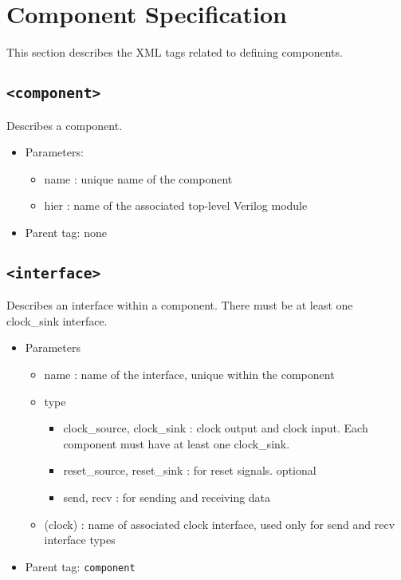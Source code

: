 \documentclass{article}
\begin{document}
\section{Component Specification}

This section describes the XML tags related to defining components.

\subsection{\texttt{<component>}}

Describes a component.

\begin{itemize}
\item{Parameters:}
\begin{itemize}
\item{name : unique name of the component}
\item{hier : name of the associated top-level Verilog module}
\end{itemize}
\item{Parent tag: none}
\end{itemize}

\subsection{\texttt{<interface>}}

Describes an interface within a component. There must be at least one clock\_sink interface.

\begin{itemize}
\item{Parameters}
\begin{itemize}
\item{name : name of the interface, unique within the component}
\item{type}
\begin{itemize}
\item{clock\_source, clock\_sink : clock output and clock input. Each component must have at least one clock\_sink.}
\item{reset\_source, reset\_sink : for reset signals. optional}
\item{send, recv : for sending and receiving data}
\end{itemize}
\item{(clock) : name of associated clock interface, used only for send and recv interface types}
\end{itemize}
\item{Parent tag: \texttt{component}}
\end{itemize}
\end{document}

